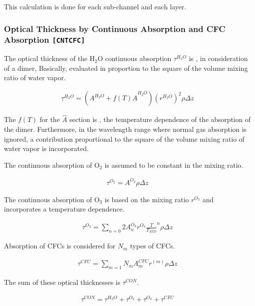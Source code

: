 This calculation is done for each sub-channel and each layer.

\hypertarget{optical-thickness-by-continuous-absorption-and-cfc-absorption-modulecntcfc}{%
\subsubsection{\texorpdfstring{Optical Thickness by Continuous
Absorption and CFC Absorption
\texttt{{[}CNTCFC{]}}}{Optical Thickness by Continuous Absorption and CFC Absorption {[}CNTCFC{]}}}
\label{optical-thickness-by-continuous-absorption-and-cfc-absorption-modulecntcfc}}

The optical thickness of the H\(_2\)O continuous absorption
\(\tau^{H_2O}\) is , in consideration of a dimer, Basically, evaluated
in proportion to the square of the volume mixing ratio of water vapor.

\begin{eqnarray}
\tau^{H_2O} = ( A^{H_2O} + f(T) \hat{A}^{H_2O} ) (r^{H_2O})^2 \rho \Delta z
\end{eqnarray}

The \(f(T)\) for the \(\hat{A}\) section is , the temperature dependence
of the absorption of the dimer. Furthermore, in the wavelength range
where normal gas absorption is ignored, a contribution proportional to 
the square of the volume mixing ratio of water vapor is incorporated.

The continuous absorption of O\(_2\) is assumed to be constant in the
mixing ratio.

\begin{eqnarray}
\tau^{O_2} = A^{O_2} \rho \Delta z
\end{eqnarray}

The continuous absorption of O\(_3\) is based on the mixing ratio
\(r^{O_3}\) and incorporates a temperature dependence.

\begin{eqnarray}
\tau^{O_3} = \sum_{n=0}{2} A^{O_3}_n r^{O_3} \frac{T}{T_{STD}}^n \rho \Delta z
\end{eqnarray}

Absorption of CFCs is considered for \(N_m\) types of CFCs.

\begin{eqnarray}
\tau^{CFC} = \sum_{m=1}{N_m} A^{CFC}_m r^{(m)} \rho \Delta z
\end{eqnarray}

The sum of these optical thicknesses is \(\tau^{CON}\).

\begin{eqnarray}
 \tau^{CON} =  \tau^{H_2O} + \tau^{O_2} + \tau^{O_3} + \tau^{CFC} 
\end{eqnarray}

